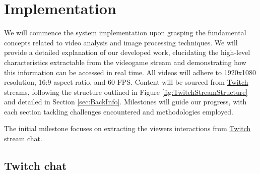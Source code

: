 
%



\chapter{Implementation}
\label{cha:Implementation}

    
    
    
    

    We will commence the system implementation upon grasping the fundamental concepts related to video analysis and image processing techniques. We will provide a detailed explanation of our developed work, elucidating the high-level characteristics extractable from the videogame stream and demonstrating how this information can be accessed in real time. All videos will adhere to 1920x1080 resolution, 16:9 aspect ratio, and 60 FPS. Content will be sourced from \href{https://www.twitch.tv/}{Twitch} streams, following the structure outlined in Figure \ref{fig:TwitchStreamStructure} and detailed in Section \ref{sec:BackInfo}. Milestones will guide our progress, with each section tackling challenges encountered and methodologies employed.
    
    The initial milestone focuses on extracting the viewers interactions from \href{https://www.twitch.tv/}{Twitch} stream chat.

\section{Twitch chat}

